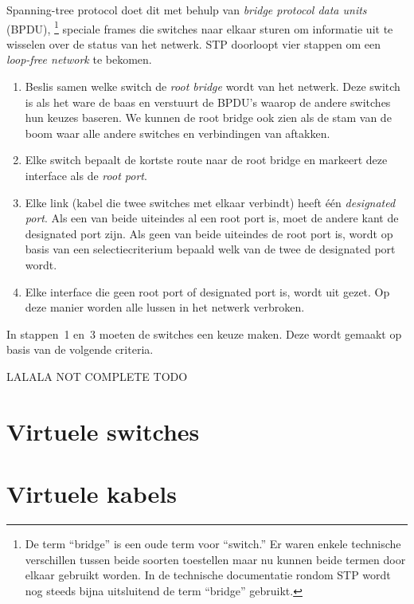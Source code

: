Spanning-tree protocol doet dit met behulp van \emph{bridge protocol data units} (BPDU),%
    \footnote{%
        De term ``bridge'' is een oude term voor ``switch.''
        Er waren enkele technische verschillen tussen beide soorten toestellen maar nu kunnen beide termen door elkaar gebruikt worden.%
        In de technische documentatie rondom STP wordt nog steeds bijna uitsluitend de term ``bridge'' gebruikt.
    }
speciale frames die switches naar elkaar sturen om informatie uit te wisselen over de status van het netwerk.
STP doorloopt vier stappen om een \emph{loop-free network} te bekomen.
\begin{enumerate}
\item
    Beslis samen welke switch de \emph{root bridge} wordt van het netwerk.
    Deze switch is als het ware de baas en verstuurt de BPDU's waarop de andere switches hun keuzes baseren.
    We kunnen de root bridge ook zien als de stam van de boom waar alle andere switches en verbindingen van aftakken.
\item
    Elke switch bepaalt de kortste route naar de root bridge en markeert deze interface als de \emph{root port}.
\item
    Elke link (kabel die twee switches met elkaar verbindt) heeft één \emph{designated port}.
    Als een van beide uiteindes al een root port is, moet de andere kant de designated port zijn.
    Als geen van beide uiteindes de root port is, wordt op basis van een selectiecriterium bepaald welk van de twee de designated port wordt.
\item
    Elke interface die geen root port of designated port is, wordt uit gezet.
    Op deze manier worden alle lussen in het netwerk verbroken.
\end{enumerate}

In stappen~1 en~3 moeten de switches een keuze maken.
Deze wordt gemaakt op basis van de volgende criteria.

LALALA NOT COMPLETE TODO


\section{Virtuele switches}


\section{Virtuele kabels}

